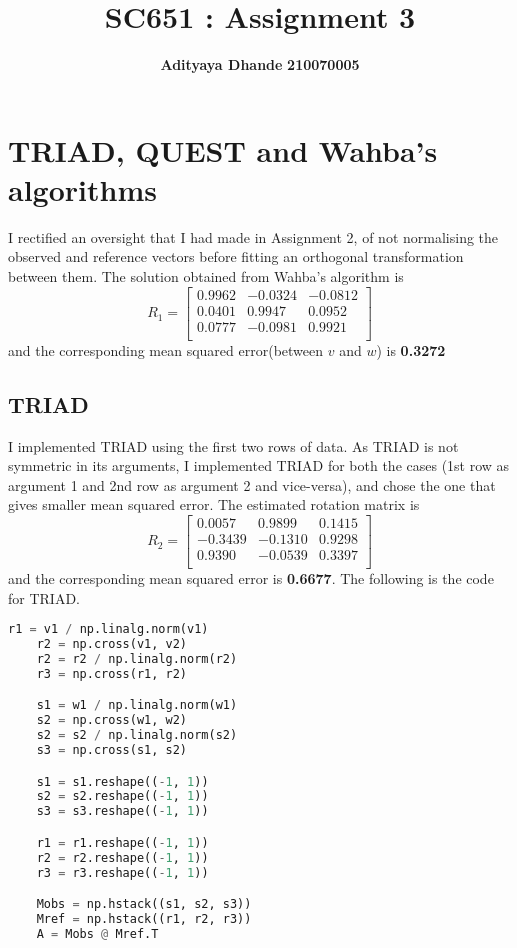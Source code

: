 \documentclass[11pt]{article}
\title{\textbf{SC651 : Assignment 3}}
\author{\textbf{Adityaya Dhande}   \hspace{8mm} \textbf{210070005}}
\date{}
\begin{document}
\maketitle
\section*{TRIAD, QUEST and Wahba's algorithms}
I rectified an oversight that I had made in Assignment 2, of not normalising the 
observed and reference vectors before fitting an orthogonal transformation between them. The solution obtained from  
Wahba's algorithm is  
\begin{equation*}
    R_1 = \begin{bmatrix}
        0.9962 & -0.0324 & -0.0812 \\ 
        0.0401 & 0.9947 & 0.0952 \\ 
        0.0777 & -0.0981 & 0.9921 \\ 
    \end{bmatrix}
\end{equation*}
and the corresponding mean squared error(between $v$ and $w$) is \textbf{0.3272}

\subsection*{TRIAD}
I implemented TRIAD using the first two rows of data. As TRIAD is not symmetric in its arguments, 
I implemented TRIAD for both the cases (1st row as argument 1 and 2nd row as argument 2 and vice-versa), and chose the one that gives smaller mean squared error.
The estimated rotation matrix is 
\begin{equation*}
    R_2 = \begin{bmatrix}
        0.0057 & 0.9899 & 0.1415 \\ 
-0.3439 & -0.1310 & 0.9298 \\ 
0.9390 & -0.0539 & 0.3397 \\ 
    \end{bmatrix}
\end{equation*}
and the corresponding mean squared error is \textbf{0.6677}.
The following is the code for TRIAD.
\begin{lstlisting}[language=python]
    r1 = v1 / np.linalg.norm(v1)
    r2 = np.cross(v1, v2) 
    r2 = r2 / np.linalg.norm(r2)
    r3 = np.cross(r1, r2)

    s1 = w1 / np.linalg.norm(w1)
    s2 = np.cross(w1, w2) 
    s2 = s2 / np.linalg.norm(s2)
    s3 = np.cross(s1, s2)

    s1 = s1.reshape((-1, 1))
    s2 = s2.reshape((-1, 1))
    s3 = s3.reshape((-1, 1))

    r1 = r1.reshape((-1, 1))
    r2 = r2.reshape((-1, 1))
    r3 = r3.reshape((-1, 1))

    Mobs = np.hstack((s1, s2, s3))
    Mref = np.hstack((r1, r2, r3))
    A = Mobs @ Mref.T 
\end{lstlisting}
\newpage
\end{document}
